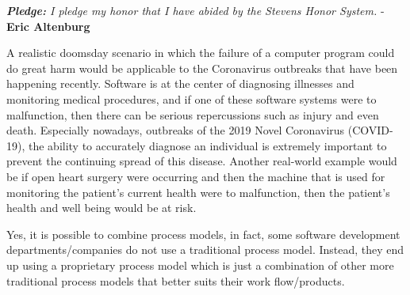 \newcommand\NAME{Eric Altenburg}  %
\newcommand\COURSE{CS 347}
\newcommand\HWNUM{1}              %


\begin{center}
	\textit{\textbf{Pledge:} I pledge my honor that I have abided by the Stevens Honor System.} - \textbf{\NAME}
\end{center}


	A realistic doomsday scenario in which the failure of a computer program could do great harm would be applicable to the Coronavirus outbreaks that have been happening recently. Software is at the center of diagnosing illnesses and monitoring medical procedures, and if one of these software systems were to malfunction, then there can be serious repercussions such as injury and even death. Especially nowadays, outbreaks of the 2019 Novel Coronavirus (COVID-19), the ability to accurately diagnose an individual is extremely important to prevent the continuing spread of this disease. Another real-world example would be if open heart surgery were occurring and then the machine that is used for monitoring the patient's current health were to malfunction, then the patient's health and well being would be at risk. 
	

	Yes, it is possible to combine process models, in fact, some software development departments/companies do not use a traditional process model. Instead, they end up using a proprietary process model which is just a combination of other more traditional process models that better suits their work flow/products.\par

